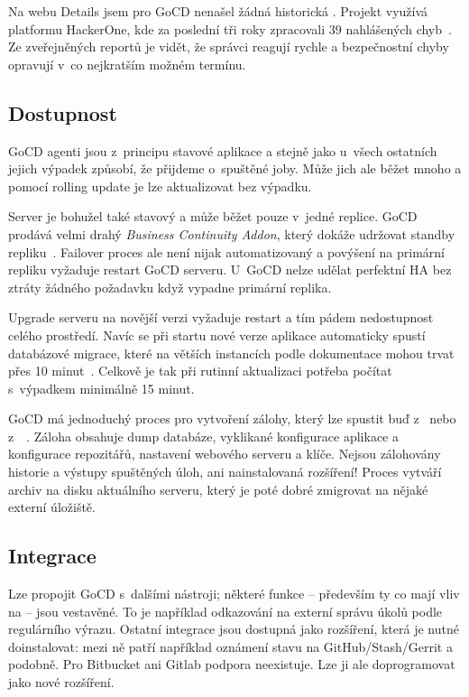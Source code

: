         Na webu  Details jsem pro GoCD nenašel žádná historická . Projekt využívá platformu HackerOne, kde za poslední tři roky zpracovali 39 nahlášených chyb~\cite{gocd-hackerone}. Ze zveřejněných reportů je vidět, že správci reagují rychle a bezpečnostní chyby opravují v~co nejkratším možném termínu.

    \subsection{Dostupnost}
        GoCD agenti jsou z~principu stavové aplikace a stejně jako u~všech ostatních \CI jejich výpadek způsobí, že přijdeme o~spuštěné joby. Může jich ale běžet mnoho a pomocí rolling update je lze aktualizovat bez výpadku.

        Server je bohužel také stavový a může běžet pouze v~jedné replice. GoCD prodává velmi drahý \textit{Business Continuity Addon}, který dokáže udržovat standby repliku~\cite{gocd-ha}. Failover proces ale není nijak automatizovaný a povýšení na primární repliku vyžaduje restart GoCD serveru. U~GoCD nelze udělat perfektní HA bez ztráty žádného požadavku když vypadne primární replika.

        Upgrade serveru na novější verzi vyžaduje restart a tím pádem nedostupnost celého prostředí. Navíc se při startu nové verze aplikace automaticky spustí databázové migrace, které na větších instancích podle dokumentace mohou trvat přes 10 minut~\cite{gocd-upgrading}. Celkově je tak při rutinní aktualizaci potřeba počítat s~výpadkem minimálně 15 minut.

        GoCD má jednoduchý proces pro vytvoření zálohy, který lze spustit buď z~ nebo z~~\cite{gocd-backup}. Záloha obsahuje dump databáze, vyklikané  konfigurace aplikace a konfigurace repozitářů, nastavení webového serveru a klíče. Nejsou zálohovány historie a výstupy spuštěných úloh, ani nainstalovaná rozšíření! Proces vytváří archiv na disku aktuálního serveru, který je poté dobré zmigrovat na nějaké externí úložiště.

    \subsection{Integrace}
        Lze propojit GoCD s~dalšími nástroji; některé funkce -- především ty co mají vliv na  -- jsou vestavěné. To je například odkazování na externí správu úkolů podle regulárního výrazu. Ostatní integrace jsou dostupná jako rozšíření, která je nutné doinstalovat: mezi ně patří například oznámení stavu na GitHub/Stash/Gerrit a podobně. Pro Bitbucket ani Gitlab podpora neexistuje. Lze ji ale doprogramovat jako nové rozšíření.

